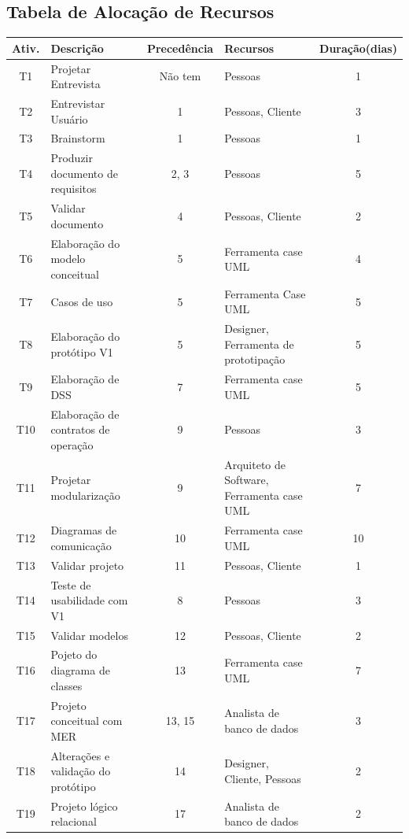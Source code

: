 \documentclass[a4paper,11pt]{article}
\begin{document}
	\subsection{Tabela de Alocação de Recursos}
	\begin{center}
	\begin{table}[H]
		\begin{tabularx}{\textwidth}{c|X|c|X|c}
			\textbf{Ativ.} & \textbf{Descrição} & \textbf{Precedência} & \textbf{Recursos} & \textbf{Duração(dias)} \\
			\hline
			T1 & Projetar Entrevista & Não tem & Pessoas & 1\\ \hline
			T2 & Entrevistar Usuário & 1 & Pessoas, Cliente & 3\\ \hline
			T3 & Brainstorm & 1 & Pessoas & 1\\ \hline
			T4 & Produzir documento de requisitos & 2, 3& Pessoas & 5\\ \hline
			T5 & Validar documento & 4 & Pessoas, Cliente & 2\\ \hline
			T6 & Elaboração do modelo conceitual& 5 & Ferramenta case UML & 4\\ \hline
			T7 & Casos de uso & 5 & Ferramenta Case UML & 5 \\ \hline
			T8 & Elaboração do protótipo V1& 5 & Designer, Ferramenta de prototipação & 5 \\ \hline
			T9 & Elaboração de DSS & 7 & Ferramenta case UML& 5\\ \hline
			T10 & Elaboração de contratos de operação& 9 & Pessoas & 3 \\ \hline
			T11 & Projetar modularização & 9 & Arquiteto de Software, Ferramenta case UML & 7\\ \hline
			T12 & Diagramas de comunicação & 10 & Ferramenta case UML & 10\\ \hline
			T13 & Validar projeto & 11 & Pessoas, Cliente & 1\\ \hline
			T14 & Teste de usabilidade com V1 & 8 & Pessoas & 3 \\ \hline
			T15 & Validar modelos & 12 & Pessoas, Cliente & 2 \\ \hline
			T16 & Pojeto do diagrama de classes & 13 & Ferramenta case UML & 7\\ \hline
			T17 & Projeto conceitual com MER & 13, 15 & Analista de banco de dados & 3 \\ \hline
			T18 & Alterações e validação do protótipo & 14 & Designer, Cliente, Pessoas & 2\\ \hline
			T19 & Projeto lógico relacional & 17 & Analista de banco de dados & 2 \\ \hline

\end{tabularx}
\end{table}
\end{center}
\end{document}
